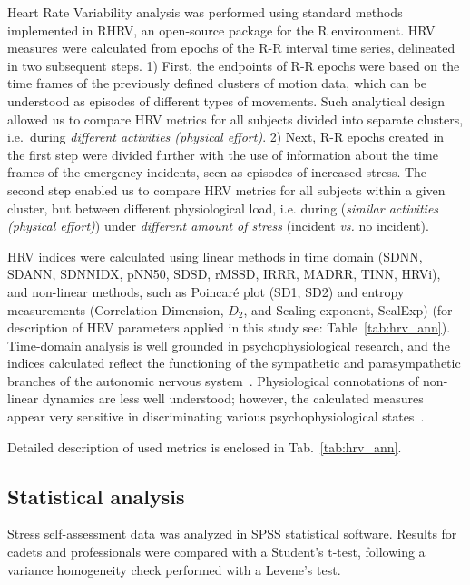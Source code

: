 \documentclass[twocolumn]{svjour3}
\begin{document}
Heart Rate Variability analysis was performed using standard methods implemented in RHRV, an open-source package for the R environment. HRV measures were calculated from epochs of the R-R interval time series, delineated in two subsequent steps. 1) First, the endpoints of R-R epochs were based on the time frames of the previously defined clusters of motion data, which can be understood as episodes of different types of movements. Such analytical design allowed us to compare HRV metrics for all subjects divided into separate clusters, i.e.\ during \textit{different activities (physical effort)}. 2) Next, R-R epochs created in the first step were divided further with the use of information about the time frames of the emergency incidents, seen as episodes of increased stress. The second step enabled us to compare HRV metrics for all subjects within a given cluster, but between different physiological load, i.e. during  (\textit{similar activities (physical effort)}) under \textit{different amount of stress} (incident \textit{vs.} no incident).


HRV indices were calculated using linear methods in time domain (SDNN, SDANN, SDNNIDX, pNN50, SDSD, rMSSD, IRRR, MADRR, TINN, HRVi), and non-linear methods, such as Poincar\'e plot (SD1, SD2) and entropy measurements (Correlation Dimension, $D_2$, and Scaling exponent, ScalExp) (for description of HRV parameters applied in this study see: Table~\ref{tab:hrv_ann}). Time-domain analysis is well grounded in psychophysiological research, and the indices calculated reflect the functioning of the sympathetic and parasympathetic branches of the autonomic nervous system~\cite{berntson1997heart}. Physiological connotations of non-linear dynamics are less well understood; however, the calculated measures appear very sensitive in discriminating various psychophysiological states~\cite{sassi2015advances,young2015we}.

Detailed description of used metrics is enclosed in Tab.~\ref{tab:hrv_ann}.


\subsection{Statistical analysis}
Stress self-assessment data was analyzed in SPSS statistical software. Results for cadets and professionals were compared with a Student's t-test, following a variance homogeneity check performed with a Levene's test.
\end{document}
